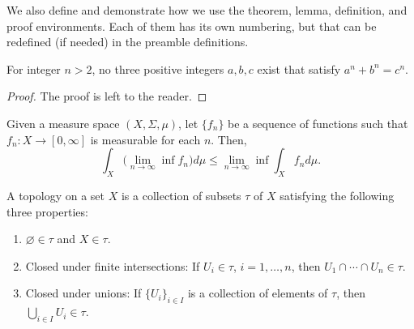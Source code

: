 
We also define and demonstrate how we use the theorem, lemma, definition, and proof environments. Each of them has its own numbering, but that can be redefined (if needed) in the preamble definitions. 


\begin{theorem}
For integer $n > 2$, no three positive integers $a, b, c$ exist that satisfy $a^n + b^n = c^n$.
\end{theorem}

\begin{proof}
The proof is left to the reader.
\end{proof}

\begin{lemma} Given a measure space $(X, \Sigma, \mu)$, let $\{f_n\}$ be a sequence of functions such that $f_n: X \to [0, \infty]$ is measurable for each $n$. Then,
$$
\int_X \bigg(\lim_{n \to \infty} \inf f_n\bigg ) d\mu  \leq \lim_{n \to \infty} \inf \int_X f_n d\mu. 
$$
\end{lemma}

\begin{definition}[Topology]
A topology on a set $X$ is a collection of subsets $\tau$ of $X$ satisfying the following three properties:
\begin{enumerate}
\item $\varnothing \in \tau$ and $X \in \tau$.
\item Closed under finite intersections: If $U_i \in \tau$, $i=1, \ldots, n$, then $U_1 \cap \cdots \cap U_n \in \tau$.
\item Closed under unions: If $\{U_i\}_{i \in I}$ is a collection of elements of $\tau$, then $\bigcup_{i \in I} U_i \in \tau$. 
\end{enumerate}
\end{definition}


